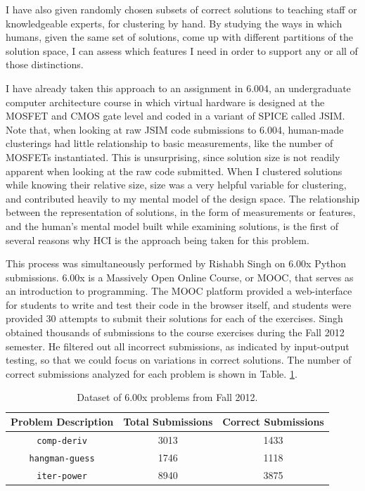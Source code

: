 \documentclass[12pt]{article}
\newcommand\tabhead[1]{\small\textbf{#1}}
\newcommand\codevar[1]{\texttt{#1}}
\begin{document}
I have also given randomly chosen subsets of correct solutions to teaching staff or knowledgeable experts, for clustering by hand. By studying the ways in which humans, given the same set of solutions, come up with different partitions of the solution space, I can assess which features I need in order to support any or all of those distinctions. 

I have already taken this approach to an assignment in 6.004, an undergraduate computer architecture course in which virtual hardware is designed at the MOSFET and CMOS gate level and coded in a variant of SPICE called JSIM. Note that, when looking at raw JSIM code submissions to 6.004, human-made clusterings had little relationship to basic measurements, like the number of MOSFETs instantiated. This is unsurprising, since solution size is not readily apparent when looking at the raw code submitted. When I clustered solutions while knowing their relative size, size was a very helpful variable for clustering, and contributed heavily to my mental model of the design space. The relationship between the representation of solutions, in the form of measurements or features, and the human's mental model built while examining solutions, is the first of several reasons why HCI is the approach being taken for this problem.

This process was simultaneously performed by Rishabh Singh on 6.00x Python submissions. 6.00x is a Massively Open Online Course, or MOOC, that serves as an introduction to programming. The MOOC platform provided a web-interface for students to write and test their code in the browser itself, and students were provided 30 attempts to submit their solutions for each of the exercises. Singh obtained thousands of submissions to the course exercises during the Fall 2012 semester. He filtered out all incorrect submissions, as indicated by input-output testing, so that we could focus on variations in correct solutions. The number of correct submissions analyzed for each problem is shown in Table. \ref{table-edx-probs}. 

\begin{table}
\begin{tabular} {|c|c|c|}
\hline
\tabhead{Problem Description} & \tabhead{Total Submissions} & \tabhead {Correct Submissions} \\ \hline
\codevar{comp-deriv} & 3013 & 1433 \\ \hline
\codevar{hangman-guess} & 1746 & 1118 \\ \hline
\codevar{iter-power} & 8940 & 3875 \\ \hline
\end{tabular}
\caption{Dataset of 6.00x problems from Fall 2012.}
\label{table-edx-probs}
\end{table}
\end{document}
